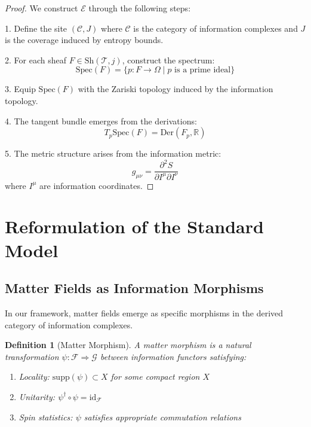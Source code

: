 \documentclass[12pt,a4paper]{article}
\newtheorem{definition}[theorem]{Definition}
\begin{document}
\begin{proof}
We construct $\mathcal{E}$ through the following steps:

1. Define the site $(\mathcal{C}, J)$ where $\mathcal{C}$ is the category of information complexes and $J$ is the coverage induced by entropy bounds.

2. For each sheaf $F \in \text{Sh}(\mathcal{T}, j)$, construct the spectrum:
\begin{equation}
\text{Spec}(F) = \{p: F \to \Omega \mid p \text{ is a prime ideal}\}
\end{equation}

3. Equip $\text{Spec}(F)$ with the Zariski topology induced by the information topology.

4. The tangent bundle emerges from the derivations:
\begin{equation}
T_p\text{Spec}(F) = \text{Der}(F_p, \mathbb{R})
\end{equation}

5. The metric structure arises from the information metric:
\begin{equation}
g_{\mu\nu} = \frac{\partial^2 S}{\partial I^\mu \partial I^\nu}
\end{equation}
where $I^\mu$ are information coordinates.
\end{proof}

\section{Reformulation of the Standard Model}

\subsection{Matter Fields as Information Morphisms}

In our framework, matter fields emerge as specific morphisms in the derived category of information complexes.

\begin{definition}[Matter Morphism]
A \emph{matter morphism} is a natural transformation $\psi: \mathcal{F} \Rightarrow \mathcal{G}$ between information functors satisfying:
\begin{enumerate}
\item Locality: $\text{supp}(\psi) \subset X$ for some compact region $X$
\item Unitarity: $\psi^\dagger \circ \psi = \text{id}_{\mathcal{F}}$
\item Spin statistics: $\psi$ satisfies appropriate commutation relations
\end{enumerate}
\end{definition}
\end{document}
